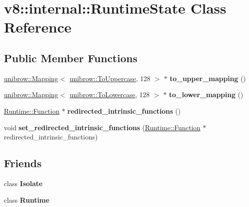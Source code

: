 \hypertarget{classv8_1_1internal_1_1RuntimeState}{}\section{v8\+:\+:internal\+:\+:Runtime\+State Class Reference}
\label{classv8_1_1internal_1_1RuntimeState}
\subsection*{Public Member Functions}
\begin{DoxyCompactItemize}
\item 
\mbox{\label{classv8_1_1internal_1_1RuntimeState_a56f5f84f2cdad0b5b4332a27f8db60b6}} 
\mbox{\hyperlink{classunibrow_1_1Mapping}{unibrow\+::\+Mapping}}$<$ \mbox{\hyperlink{structunibrow_1_1ToUppercase}{unibrow\+::\+To\+Uppercase}}, 128 $>$ $\ast$ {\bfseries to\+\_\+upper\+\_\+mapping} ()
\item 
\mbox{\label{classv8_1_1internal_1_1RuntimeState_a93ae0cde56b5f23a3efdb4ad7d12ef23}} 
\mbox{\hyperlink{classunibrow_1_1Mapping}{unibrow\+::\+Mapping}}$<$ \mbox{\hyperlink{structunibrow_1_1ToLowercase}{unibrow\+::\+To\+Lowercase}}, 128 $>$ $\ast$ {\bfseries to\+\_\+lower\+\_\+mapping} ()
\item 
\mbox{\label{classv8_1_1internal_1_1RuntimeState_a0900a871ae77f8335ba2a6c03e426fc6}} 
\mbox{\hyperlink{structv8_1_1internal_1_1Runtime_1_1Function}{Runtime\+::\+Function}} $\ast$ {\bfseries redirected\+\_\+intrinsic\+\_\+functions} ()
\item 
\mbox{\label{classv8_1_1internal_1_1RuntimeState_a236e4b62dd61be2092a2b1bba415136b}} 
void {\bfseries set\+\_\+redirected\+\_\+intrinsic\+\_\+functions} (\mbox{\hyperlink{structv8_1_1internal_1_1Runtime_1_1Function}{Runtime\+::\+Function}} $\ast$redirected\+\_\+intrinsic\+\_\+functions)
\end{DoxyCompactItemize}
\subsection*{Friends}
\begin{DoxyCompactItemize}
\item 
\mbox{\label{classv8_1_1internal_1_1RuntimeState_aba4f0964bdacf2bbf62cf876e5d28d0a}} 
class {\bfseries Isolate}
\item 
\mbox{\label{classv8_1_1internal_1_1RuntimeState_af3d14e26ba8af9e6cc5a32aad8446de7}} 
class {\bfseries Runtime}
\end{DoxyCompactItemize}


